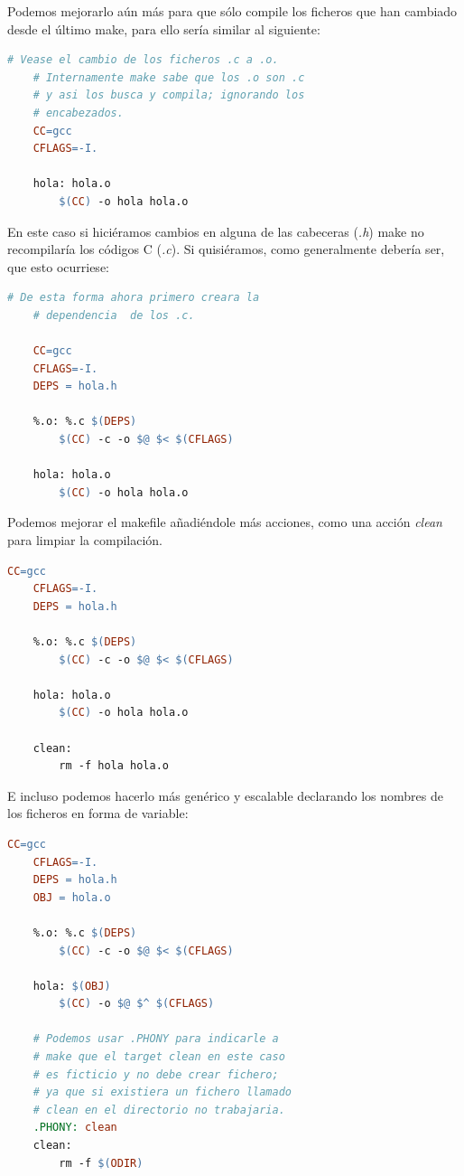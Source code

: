 \documentclass[a4paper, 11pt, titlepage]{article}
\begin{document}
    Podemos mejorarlo aún más para que sólo compile los ficheros que han cambiado desde el 
    último make, para ello sería similar al siguiente:

    \begin{lstlisting}[language=make]
    # Vease el cambio de los ficheros .c a .o.
    # Internamente make sabe que los .o son .c 
    # y asi los busca y compila; ignorando los 
    # encabezados.
    CC=gcc
    CFLAGS=-I.

    hola: hola.o
        $(CC) -o hola hola.o \end{lstlisting}
    
    En este caso si hiciéramos cambios en alguna de las cabeceras (\textit{.h}) make no 
    recompilaría los códigos C (\textit{.c}). Si quisiéramos, como generalmente debería ser,
    que esto ocurriese:

    \begin{lstlisting}[language=make]
    # De esta forma ahora primero creara la 
    # dependencia  de los .c.

    CC=gcc
    CFLAGS=-I.
    DEPS = hola.h
    
    %.o: %.c $(DEPS)
        $(CC) -c -o $@ $< $(CFLAGS)
    
    hola: hola.o 
        $(CC) -o hola hola.o\end{lstlisting}

    Podemos mejorar el makefile añadiéndole más acciones, como una acción \textit{clean} 
    para limpiar la compilación.
    
    \begin{lstlisting}[language=make]
    CC=gcc
    CFLAGS=-I.
    DEPS = hola.h
    
    %.o: %.c $(DEPS)
        $(CC) -c -o $@ $< $(CFLAGS)
    
    hola: hola.o 
        $(CC) -o hola hola.o
    
    clean: 
        rm -f hola hola.o\end{lstlisting}

    E incluso podemos hacerlo más genérico y escalable declarando los nombres de los ficheros 
    en forma de variable:

    \begin{lstlisting}[language=make]
    CC=gcc
    CFLAGS=-I.
    DEPS = hola.h
    OBJ = hola.o 
    
    %.o: %.c $(DEPS)
        $(CC) -c -o $@ $< $(CFLAGS)
    
    hola: $(OBJ)
        $(CC) -o $@ $^ $(CFLAGS)
    
    # Podemos usar .PHONY para indicarle a 
    # make que el target clean en este caso 
    # es ficticio y no debe crear fichero; 
    # ya que si existiera un fichero llamado 
    # clean en el directorio no trabajaria.
    .PHONY: clean
    clean: 
        rm -f $(ODIR)\end{lstlisting}
\end{document}
